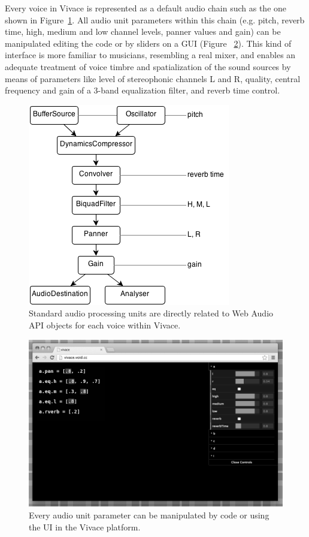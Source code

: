 \documentclass[12pt,times,twocolumn]{article}
\begin{document}
Every voice in Vivace is represented as a default audio chain such as
the one shown in Figure~\ref{fig:chain}. All audio unit parameters
within this chain (e.g. pitch, reverb time, high, medium and low
channel levels, panner values and gain) can be manipulated editing the
code or by sliders on a GUI (Figure ~\ref{fig:ui}). This kind of
interface is more familiar to musicians, resembling a real mixer, and
enables an adequate treatment of voice timbre and spatialization of
the sound sources by means of parameters like level of stereophonic
channels L and R, quality, central frequency and gain of a 3-band
equalization filter, and reverb time control.

\begin{figure}[htpb]
  \begin{center}
    \includegraphics[scale=.5]{img/fig_chain_.png}
    \caption{Standard audio processing units are directly related to Web Audio API objects for
      each voice within Vivace.}
    \label{fig:chain}
  \end{center}
\end{figure}

\begin{figure}[htpb]
  \begin{center}
    \includegraphics[scale=.3]{img/fig_ui_.png}
    \caption{Every audio unit parameter can be manipulated by code or
      using the UI in the Vivace platform.}
    \label{fig:ui}
  \end{center}
\end{figure}
\end{document}
